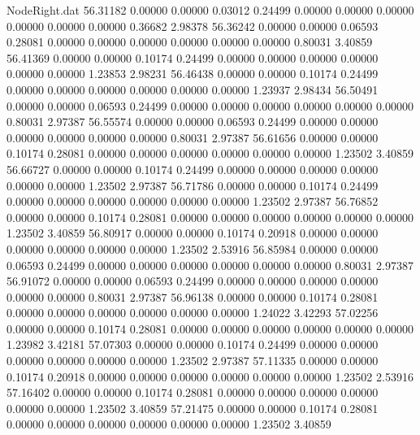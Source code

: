 \begin{filecontents}{NodeRight.dat}
  56.31182    0.00000    0.00000     0.03012    0.24499    0.00000    0.00000    0.00000    0.00000    0.00000    0.00000    0.36682    2.98378
  56.36242    0.00000    0.00000     0.06593    0.28081    0.00000    0.00000    0.00000    0.00000    0.00000    0.00000    0.80031    3.40859
  56.41369    0.00000    0.00000     0.10174    0.24499    0.00000    0.00000    0.00000    0.00000    0.00000    0.00000    1.23853    2.98231
  56.46438    0.00000    0.00000     0.10174    0.24499    0.00000    0.00000    0.00000    0.00000    0.00000    0.00000    1.23937    2.98434
  56.50491    0.00000    0.00000     0.06593    0.24499    0.00000    0.00000    0.00000    0.00000    0.00000    0.00000    0.80031    2.97387
  56.55574    0.00000    0.00000     0.06593    0.24499    0.00000    0.00000    0.00000    0.00000    0.00000    0.00000    0.80031    2.97387
  56.61656    0.00000    0.00000     0.10174    0.28081    0.00000    0.00000    0.00000    0.00000    0.00000    0.00000    1.23502    3.40859
  56.66727    0.00000    0.00000     0.10174    0.24499    0.00000    0.00000    0.00000    0.00000    0.00000    0.00000    1.23502    2.97387
  56.71786    0.00000    0.00000     0.10174    0.24499    0.00000    0.00000    0.00000    0.00000    0.00000    0.00000    1.23502    2.97387
  56.76852    0.00000    0.00000     0.10174    0.28081    0.00000    0.00000    0.00000    0.00000    0.00000    0.00000    1.23502    3.40859
  56.80917    0.00000    0.00000     0.10174    0.20918    0.00000    0.00000    0.00000    0.00000    0.00000    0.00000    1.23502    2.53916
  56.85984    0.00000    0.00000     0.06593    0.24499    0.00000    0.00000    0.00000    0.00000    0.00000    0.00000    0.80031    2.97387
  56.91072    0.00000    0.00000     0.06593    0.24499    0.00000    0.00000    0.00000    0.00000    0.00000    0.00000    0.80031    2.97387
  56.96138    0.00000    0.00000     0.10174    0.28081    0.00000    0.00000    0.00000    0.00000    0.00000    0.00000    1.24022    3.42293
  57.02256    0.00000    0.00000     0.10174    0.28081    0.00000    0.00000    0.00000    0.00000    0.00000    0.00000    1.23982    3.42181
  57.07303    0.00000    0.00000     0.10174    0.24499    0.00000    0.00000    0.00000    0.00000    0.00000    0.00000    1.23502    2.97387
  57.11335    0.00000    0.00000     0.10174    0.20918    0.00000    0.00000    0.00000    0.00000    0.00000    0.00000    1.23502    2.53916
  57.16402    0.00000    0.00000     0.10174    0.28081    0.00000    0.00000    0.00000    0.00000    0.00000    0.00000    1.23502    3.40859
  57.21475    0.00000    0.00000     0.10174    0.28081    0.00000    0.00000    0.00000    0.00000    0.00000    0.00000    1.23502    3.40859

\end{filecontents}
